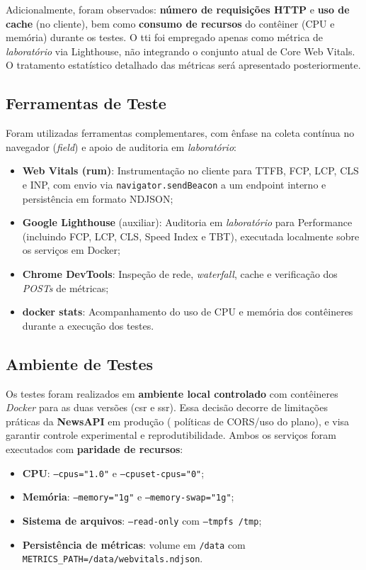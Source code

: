\noindent
Adicionalmente, foram observados: \textbf{número de requisições HTTP} e \textbf{uso de cache} (no cliente), bem como \textbf{consumo de recursos} do contêiner (CPU e memória) durante os testes. O \acrfull{tti} foi empregado apenas como métrica de \textit{laboratório} via Lighthouse, não integrando o conjunto atual de Core Web Vitals. O tratamento estatístico detalhado das métricas será apresentado posteriormente.

\subsection{Ferramentas de Teste}

Foram utilizadas ferramentas complementares, com ênfase na coleta contínua no navegador (\textit{field}) e apoio de auditoria em \textit{laboratório}:

\begin{itemize}
    \item \textbf{Web Vitals (\acrfull{rum})}: Instrumentação no cliente para TTFB, FCP, LCP, CLS e INP, com envio via \texttt{navigator.sendBeacon} a um endpoint interno e persistência em formato NDJSON;
    \item \textbf{Google Lighthouse} (auxiliar): Auditoria em \textit{laboratório} para Performance (incluindo FCP, LCP, CLS, Speed Index e TBT), executada localmente sobre os serviços em Docker;
    \item \textbf{Chrome DevTools}: Inspeção de rede, \textit{waterfall}, cache e verificação dos \textit{POSTs} de métricas;
    \item \textbf{docker stats}: Acompanhamento do uso de CPU e memória dos contêineres durante a execução dos testes.
\end{itemize}

\subsection{Ambiente de Testes}

Os testes foram realizados em \textbf{ambiente local controlado} com contêineres \textit{Docker} para as duas versões (\acrshort{csr} e \acrshort{ssr}). Essa decisão decorre de limitações práticas da \textbf{NewsAPI} em produção ( políticas de CORS/uso do plano), e visa garantir controle experimental e reprodutibilidade. Ambos os serviços foram executados com \textbf{paridade de recursos}:

\begin{itemize}
    \item \textbf{CPU}: \texttt{--cpus="1.0"} e \texttt{--cpuset-cpus="0"};
    \item \textbf{Memória}: \texttt{--memory="1g"} e \texttt{--memory-swap="1g"};
    \item \textbf{Sistema de arquivos}: \texttt{--read-only} com \texttt{--tmpfs /tmp};
    \item \textbf{Persistência de métricas}: volume em \texttt{/data} com \texttt{METRICS\_PATH=/data/webvitals.ndjson}.
\end{itemize}

